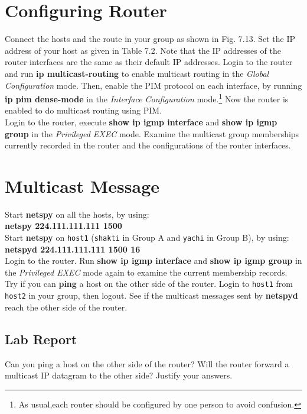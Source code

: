 \documentclass[10pt,a4paper]{article}
\numberwithin{equation}{section}
\numberwithin{figure}{section}
\numberwithin{table}{section}
\begin{document}
    \section{Configuring Router}
    Connect the hosts and the route in your group as shown in Fig. 7.13. Set the IP address of your host as given in Table 7.2. Note that the IP addresses of the router interfaces are the same as their default IP addresses.
    Login to the router and run \textbf{ip multicast-routing} to enable multicast routing in the \textit{Global Configuration} mode.
    Then, enable the PIM protocol on each interface, by running \textbf{ip pim dense-mode} in the \textit{Interface Configuration} mode.\footnote{As usual,each router should be configured by one person to avoid confusion.} Now the router is enabled to do multicast routing using PIM. \\
    Login to the router, execute \textbf{show ip igmp interface} and \textbf{show ip igmp group} in the \textit{Privileged EXEC} mode.
    Examine the multicast group memberships currently recorded in the router and the configurations of the router interfaces.

    \section{Multicast Message}
    Start \textbf{netspy} on all the hosts, by using: \\
    \textbf{netspy 224.111.111.111 1500} \\
    Start \textbf{netspy} on \texttt{host1} (\texttt{shakti} in Group A and \texttt{yachi} in Group B), by using: \\
    \textbf{netspyd 224.111.111.111 1500 16} \\
    Login to the router.
    Run \textbf{show ip igmp interface} and \textbf{show ip igmp group} in the \textit{Privileged EXEC} mode again to examine the current membership records. \\
    Try if you can \textbf{ping} a host on the other side of the router.
    Login to \texttt{host1} from \texttt{host2} in your group, then logout.
    See if the multicast messages sent by \textbf{netspyd} reach the other side of the router.
    \subsection*{Lab Report}
    Can you ping a host on the other side of the router?
    Will the router forward a multicast IP datagram to the other side?
    Justify your answers.
\end{document}
